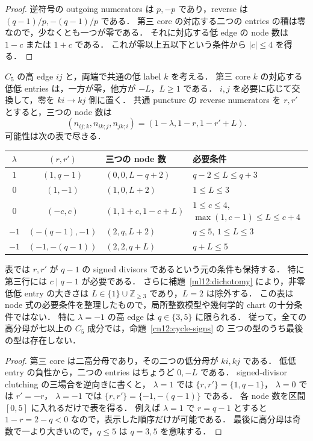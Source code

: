 \begin{proof}
逆符号の outgoing numerators は $p,-p$ であり，reverse は $(q-1)/p,-(q-1)/p$ である．
第三 core の対応する二つの entries の積は零なので，少なくとも一つが零である．
それに対応する低 edge の node 数は $1-c$ または $1+c$ である．
これが零以上五以下という条件から $|c|\leq4$ を得る．
\end{proof}

\begin{proposition}\label{cn12:C5-table}
$C_5$ の高 edge $ij$ と，両端で共通の低 label $k$ を考える．
第三 core $k$ の対応する低低 entries は，一方が零，他方が $-L$，$L\geq1$ である．
$i,j$ を必要に応じて交換して，零を $ki\to kj$ 側に置く．
共通 puncture の reverse numerators を $r,r'$ とすると，三つの node 数は
\[
 (n_{ij;k},n_{ik;j},n_{jk;i})=(1-\lambda,1-r,1-r'+L).
\]
可能性は次の表で尽きる．
\begin{center}
\small
\begin{tabular}{ccll}
$\lambda$ & $(r,r')$ & 三つの node 数 & 必要条件 \\
\hline
$1$ & $(1,q-1)$ & $(0,0,L-q+2)$ & $q-2\leq L\leq q+3$ \\
$0$ & $(1,-1)$ & $(1,0,L+2)$ & $1\leq L\leq3$ \\
$0$ & $(-c,c)$ & $(1,1+c,1-c+L)$ & $1\leq c\leq4$, $\max(1,c-1)\leq L\leq c+4$ \\
$-1$ & $(-(q-1),-1)$ & $(2,q,L+2)$ & $q\leq5$, $1\leq L\leq3$ \\
$-1$ & $(-1,-(q-1))$ & $(2,2,q+L)$ & $q+L\leq5$
\end{tabular}
\end{center}
表では $r,r'$ が $q-1$ の signed divisors であるという元の条件も保持する．
特に第三行には $c\mid q-1$ が必要である．
さらに補題~\ref{ml12:dichotomy} により，非零低低 entry の大きさは
$L\in\{1\}\cup\mathbb Z_{\geq3}$ であり，$L=2$ は除外する．
この表は node 式の必要条件を整理したもので，局所整数模型や幾何学的 chart の十分条件ではない．
特に $\lambda=-1$ の高 edge は $q\in\{3,5\}$ に限られる．
従って，全ての高分母が七以上の $C_5$ 成分では，命題~\ref{cn12:cycle-signs} の
三つの型のうち最後の型は存在しない．
\end{proposition}

\begin{proof}
第三 core は二高分母であり，その二つの低分母が $ki,kj$ である．
低低 entry の負性から，二つの entries はちょうど $0,-L$ である．
signed-divisor clutching の三場合を逆向きに書くと，
$\lambda=1$ では $\{r,r'\}=\{1,q-1\}$，
$\lambda=0$ では $r'=-r$，
$\lambda=-1$ では $\{r,r'\}=\{-1,-(q-1)\}$ である．
各 node 数を区間 $[0,5]$ に入れるだけで表を得る．
例えば $\lambda=1$ で $r=q-1$ とすると $1-r=2-q<0$ なので，表示した順序だけが可能である．
最後に高分母は奇数で一より大きいので，$q\leq5$ は $q=3,5$ を意味する．
\end{proof}

